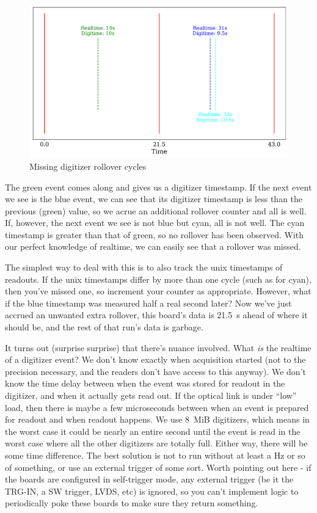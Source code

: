 \begin{figure}[h]
  \includegraphics[width=\textwidth]{images/digitizers/missed_rollover}
  \caption{Missing digitizer rollover cycles}\label{fig:digi_missed_rollover}
\end{figure}

The green event comes along and gives us a digitizer timestamp.
If the next event we see is the blue event, we can see that its digitizer timestamp is less than the previous (green) value, so we acrue an additional rollover counter and all is well.
If, however, the next event we see is not blue but cyan, all is not well.
The cyan timestamp is greater than that of green, so no rollover has been observed.
With our perfect knowledge of realtime, we can easily see that a rollover was missed.

The simplest way to deal with this is to also track the unix timestamps of readouts.
If the unix timestamps differ by more than one cycle (such as for cyan), then you've missed one, so increment your counter as appropriate.
However, what if the blue timestamp was measured half a real second later?
Now we've just accrued an unwanted extra rollover, this board's data is \SI{21.5}{\second} ahead of where it should be, and the rest of that run's data is garbage.

It turns out (surprise surprise) that there's nuance involved.
What \emph{is} the realtime of a digitizer event?
We don't know exactly when acquisition started (not to the precision necessary, and the readers don't have access to this anyway).
We don't know the time delay between when the event was stored for readout in the digitizer, and when it actually gets read out.
If the optical link is under ``low'' load, then there is maybe a few microseconds between when an event is prepared for readout and when readout happens.
We use 8~MiB digitizers, which means in the worst case it could be nearly an entire second until the event is read in the worst case where all the other digitizers are totally full.
Either way, there will be some time difference.
The best solution is not to run without at least a Hz or so of something, or use an external trigger of some sort.
Worth pointing out here - if the boards are configured in self-trigger mode, any external trigger (be it the TRG-IN, a SW trigger, LVDS, etc) is ignored, so you can't implement logic to periodically poke these boards to make sure they return something.

